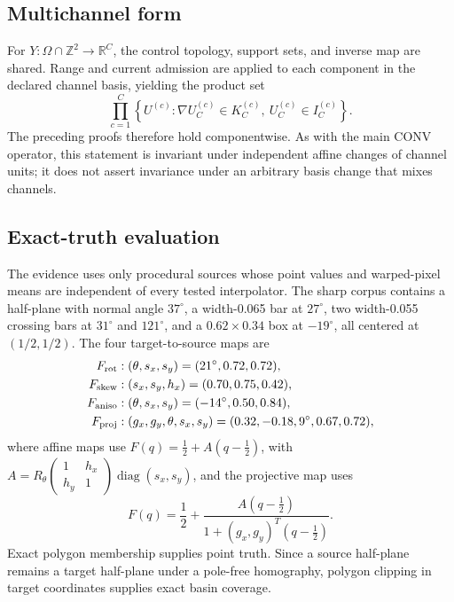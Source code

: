 \documentclass[journal]{IEEEtran}
\newcommand{\R}{\mathbb{R}}
\begin{document}
\subsection{Multichannel form}

For \(Y:\Omega\cap\mathbb Z^2\to\R^C\), the control topology, support sets,
and inverse map are shared.  Range and current admission are applied to each
component in the declared channel basis, yielding the product set
\begin{equation}
 \prod_{c=1}^C
 \left\{U^{(c)}:\nabla U_C^{(c)}\in K_C^{(c)},\ 
 U_C^{(c)}\in I_C^{(c)}\right\}.
 \label{eq:warpmultichannel}
\end{equation}
The preceding proofs therefore hold componentwise.  As with the main CONV
operator, this statement is invariant under independent affine changes of
channel units; it does not assert invariance under an arbitrary basis change
that mixes channels.

\subsection{Exact-truth evaluation}

The evidence uses only procedural sources whose point values and warped-pixel
means are independent of every tested interpolator.  The sharp corpus
contains a half-plane with normal angle \(37^\circ\), a width-0.065 bar at
\(27^\circ\), two width-0.055 crossing bars at \(31^\circ\) and
\(121^\circ\), and a \(0.62\times0.34\) box at \(-19^\circ\), all centered
at \((1/2,1/2)\).  The four target-to-source maps are
\begin{align}
 F_{\rm rot}&: (\theta,s_x,s_y)=(21^\circ,0.72,0.72),\nonumber\\
 F_{\rm skew}&: (s_x,s_y,h_x)=(0.70,0.75,0.42),\nonumber\\
 F_{\rm aniso}&: (\theta,s_x,s_y)=(-14^\circ,0.50,0.84),\nonumber\\
 F_{\rm proj}&: (g_x,g_y,\theta,s_x,s_y)
 =(0.32,-0.18,9^\circ,0.67,0.72),
 \label{eq:warpcorpusmaps}
\end{align}
where affine maps use \(F(q)=\tfrac12+A(q-\tfrac12)\), with
\(A=R_\theta\left(\begin{smallmatrix}1&h_x\\h_y&1\end{smallmatrix}\right)
\operatorname{diag}(s_x,s_y)\), and the projective map uses
\begin{equation}
 F(q)=\frac12+
 \frac{A(q-\frac12)}{1+(g_x,g_y)^T(q-\frac12)}.
 \label{eq:warpprojectivedeclared}
\end{equation}
Exact polygon membership supplies point truth.  Since a source half-plane
remains a target half-plane under a pole-free homography, polygon clipping in
target coordinates supplies exact basin coverage.
\end{document}
